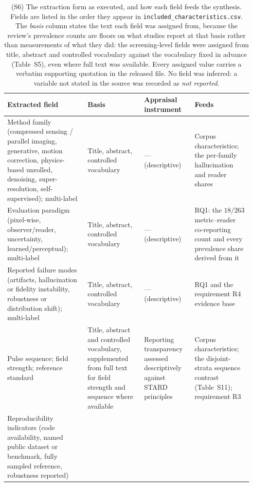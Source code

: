 \documentclass[11pt]{article}
\begin{document}
\begin{table}[t]
\centering
\caption{(S6) The extraction form as executed, and how each field feeds the synthesis.
Fields are listed in the order they appear in \texttt{included\_characteristics.csv}. The
\emph{basis} column states the text each field was assigned from, because the review's
prevalence counts are floors on what studies report at that basis rather than measurements
of what they did: the screening-level fields were assigned from title, abstract and
controlled vocabulary against the vocabulary fixed in advance (Table~S5), even where full
text was available. Every assigned value carries a verbatim supporting quotation in the
released file. No field was inferred: a variable not stated in the source was recorded as
\emph{not reported}.}
\label{tab:extraction}
\small
\setlength{\tabcolsep}{5pt}
\renewcommand{\arraystretch}{1.15}
\begin{tabular}{p{} p{} p{} p{}}
\hline
\textbf{Extracted field} & \textbf{Basis} & \textbf{Appraisal instrument} & \textbf{Feeds} \\
\hline
Method family (compressed sensing / parallel imaging, generative, motion correction,
physics-based unrolled, denoising, super-resolution, self-supervised); multi-label
& Title, abstract, controlled vocabulary
& --- (descriptive)
& Corpus characteristics; the per-family hallucination and reader shares \\
\hline
Evaluation paradigm (pixel-wise, observer/reader, uncertainty, learned/perceptual);
multi-label
& Title, abstract, controlled vocabulary
& --- (descriptive)
& RQ1: the $18/263$ metric--reader co-reporting count and every prevalence share derived
from it \\
\hline
Reported failure modes (artifacts, hallucination or fidelity instability, robustness or
distribution shift); multi-label
& Title, abstract, controlled vocabulary
& --- (descriptive)
& RQ1 and the requirement R4 evidence base \\
\hline
Pulse sequence; field strength; reference standard
& Title, abstract and controlled vocabulary, supplemented from full text for field
strength and sequence where available
& Reporting transparency assessed descriptively against STARD principles
\cite{bossuyt2015stard}
& Corpus characteristics; the disjoint-strata sequence contrast (Table~S11); requirement R3 \\
\hline
Reproducibility indicators (code availability, named public dataset or benchmark, fully
sampled reference, robustness reported)

\end{tabular}
\end{table}
\end{document}
